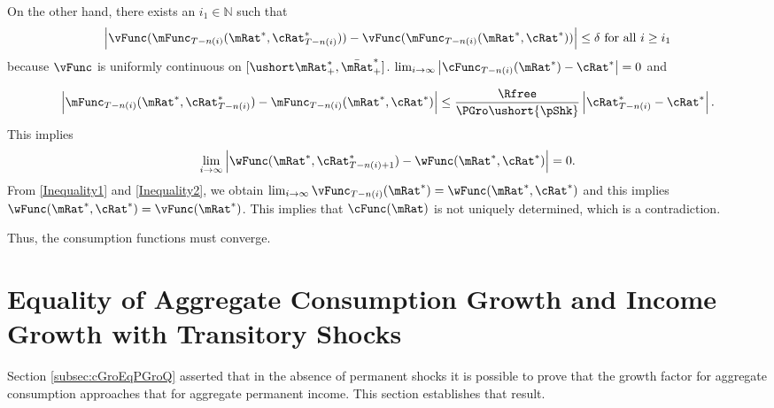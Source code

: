 \documentclass[titlepage]{\econtex}\providecommand{\texname}{BufferStockTheory}%
\begin{document}
On the other hand, there exists an $i_{1} \in \mathbb{N}$ such that
\begin{equation}
\left\vert \vFunc( \mFunc_{T-n( i) }( \mRat^{*},
\cRat^{*}_{T-n( i) }) ) -\vFunc( \mFunc
_{T-n( i) }( \mRat^{*},\cRat^{*}) )
\right\vert \leq \delta \text{ for all }i\geq i_{1}
\end{equation}
because $\vFunc$ is uniformly continuous on $[\ushort\mRat_{+}^{*},\bar\mRat_{+}^{*}]$. $\lim_{i\rightarrow \infty }\left\vert \cFunc_{T-n(i)}(\mRat^{*})-\cRat^{*}
\right\vert =0$ and

\begin{equation}
\left\vert \mFunc_{T-n( i) }( \mRat^{*},\cRat^{*}
_{T-n( i) }) -\mFunc_{T-n( i) }(
\mRat^{*},\cRat^{*}) \right\vert \leq \frac{\Rfree}{\PGro\ushort{\pShk}}
\left\vert \cRat^{*}_{T-n( i) }-\cRat^{*}\right\vert.
\end{equation}
This implies
\begin{equation}
\lim_{i\rightarrow \infty }\left\vert \wFunc(\mRat^{*},\cRat^{*}_{T-n(i)+1}) -\wFunc(\mRat^{*},\cRat^{*})
\right\vert =0  \label{Inequality2}.
\end{equation}
From \eqref{Inequality1} and \eqref{Inequality2}, we obtain $\lim_{i\rightarrow \infty }\vFunc_{T-n(i)}(\mRat^{*}
)=\wFunc( \mRat^{*},\cRat^{*}) $ and this implies $\wFunc(
\mRat^{*},\cRat^{*}) =\vFunc(\mRat^{*})$. This implies that $
\cFunc(\mRat)$ is not uniquely determined, which is a contradiction.

Thus, the consumption functions must converge.


\section{Equality of Aggregate Consumption Growth and Income Growth with Transitory Shocks}\label{sec:CGroEqPGro}

Section \ref{subsec:cGroEqPGroQ} asserted that in the absence of permanent shocks it is possible to prove
that the growth factor for aggregate consumption approaches that for aggregate permanent
income.  This section establishes that result.
\end{document}
